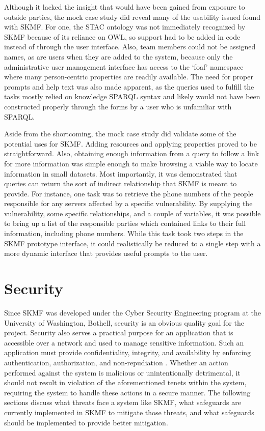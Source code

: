 Although it lacked the insight that would have been gained from exposure to outside parties, the mock case study did reveal many of the usability issued found with SKMF. For one, the STAC ontology was not immediately recognized by SKMF because of its reliance on OWL, so support had to be added in code instead of through the user interface. Also, team members could not be assigned names, as are users when they are added to the system, because only the administrative user management interface has access to the `foaf' namespace where many person-centric properties are readily available. The need for proper prompts and help text was also made apparent, as the queries used to fulfill the tasks mostly relied on knowledge SPARQL syntax and likely would not have been constructed properly through the forms by a user who is unfamiliar with SPARQL.

Aside from the shortcoming, the mock case study did validate some of the potential uses for SKMF. Adding resources and applying properties proved to be straightforward. Also, obtaining enough information from a query to follow a link for more information was simple enough to make browsing a viable way to locate information in small datasets. Most importantly, it was demonstrated that queries can return the sort of indirect relationship that SKMF is meant to provide. For instance, one task was to retrieve the phone numbers of the people responsible for any servers affected by a specific vulnerability. By supplying the vulnerability, some specific relationships, and a couple of variables, it was possible to bring up a list of the responsible parties which contained links to their full information, including phone numbers. While this task took two steps in the SKMF prototype interface, it could realistically be reduced to a single step with a more dynamic interface that provides useful prompts to the user.


\section{Security}
\label{result:security}

Since SKMF was developed under the Cyber Security Engineering program at the University of Washington, Bothell, security is an obvious quality goal for the project. Security also serves a practical purpose for an application that is accessible over a network and used to manage sensitive information. Such an application must provide confidentiality, integrity, and availability by enforcing authentication, authorization, and non-repudiation
\cite{incidentresponse}.
Whether an action performed against the system is malicious or unintentionally detrimental, it should not result in violation of the aforementioned tenets within the system, requiring the system to handle these actions in a secure manner. The following sections discuss what threats face a system like SKMF, what safeguards are currently implemented in SKMF to mitigate those threats, and what safeguards should be implemented to provide better mitigation.


